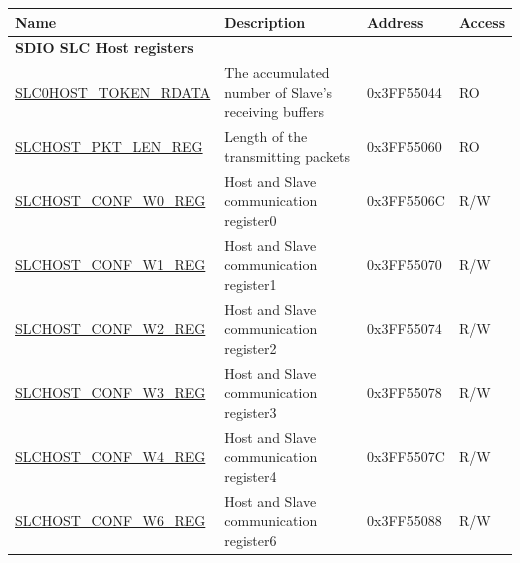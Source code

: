 \begin{longtable}{ | m{6cm} | m{7cm} | m{2cm} | m{1cm} | }
\hline\rowcolor{lightgray}
Name & Description &  Address & Access \\ \hline
\multicolumn{4}{|l|}{\textbf{SDIO SLC Host registers}} \\ \hline
\hyperref[regdesc:SLC0HOSTTOKENRDATA]{SLC0HOST\_TOKEN\_RDATA} & The accumulated number of Slave's receiving buffers  & 0x3FF55044 & RO \\ \hline
\hyperref[regdesc:SLCHOSTPKTLENREG]{SLCHOST\_PKT\_LEN\_REG} &Length of the transmitting packets & 0x3FF55060 & RO \\ \hline
\hyperref[regdesc:SLCHOSTCONFW0REG]{SLCHOST\_CONF\_W0\_REG} & Host and Slave communication register0 & 0x3FF5506C & R/W \\ \hline
\hyperref[regdesc:SLCHOSTCONFW1REG]{SLCHOST\_CONF\_W1\_REG} & Host and Slave communication register1& 0x3FF55070 & R/W \\ \hline
\hyperref[regdesc:SLCHOSTCONFW2REG]{SLCHOST\_CONF\_W2\_REG} &Host and Slave communication register2 & 0x3FF55074 & R/W \\ \hline
\hyperref[regdesc:SLCHOSTCONFW3REG]{SLCHOST\_CONF\_W3\_REG} &Host and Slave communication register3 & 0x3FF55078 & R/W \\ \hline
\hyperref[regdesc:SLCHOSTCONFW4REG]{SLCHOST\_CONF\_W4\_REG} &Host and Slave communication register4 & 0x3FF5507C & R/W \\ \hline
\hyperref[regdesc:SLCHOSTCONFW6REG]{SLCHOST\_CONF\_W6\_REG} & Host and Slave communication register6& 0x3FF55088 & R/W \\ \hline


\end{longtable}
